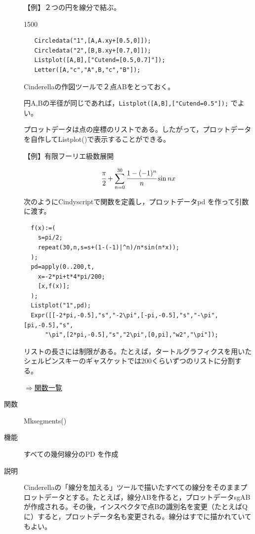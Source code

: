 \documentclass[papersize,a4paper,12pt,uplatex]{jsarticle}
\begin{document}
\begin{description}
\vspace{\baselineskip}
【例】２つの円を線分で結ぶ。
  
\begin{layer}{150}{0}
\end{layer}
\hspace{20mm}

\begin{verbatim}
   Circledata("1",[A,A.xy+[0.5,0]]);
   Circledata("2",[B,B.xy+[0.7,0]]);
   Listplot([A,B],["Cutend=[0.5,0.7]"]);
   Letter([A,"c","A",B,"c","B"]);
\end{verbatim}
  Cinderellaの作図ツールで２点ABをとっておく。

円A,Bの半径が同じであれば，\verb|Listplot([A,B],["Cutend=0.5"]);| でよい。

\vspace{\baselineskip}
プロットデータは点の座標のリストである。したがって，プロットデータを自作してListplot()で表示することができる。

\vspace{\baselineskip}
【例】有限フーリエ級数展開

           \[\cfrac{\pi}{2}+\sum_{n=0}^{30} \cfrac{1-(-1)^n}{n}\sin nx\]

次のようにCindyscriptで関数を定義し，プロットデータpd を作って引数に渡す。
\begin{verbatim}
  f(x):=(
    s=pi/2;
    repeat(30,n,s=s+(1-(-1)|^n)/n*sin(n*x));
  );
  pd=apply(0..200,t,
    x=-2*pi+t*4*pi/200;
    [x,f(x)];
  );
  Listplot("1",pd);
  Expr([[-2*pi,-0.5],"s","-2\pi",[-pi,-0.5],"s","-\pi",[pi,-0.5],"s",
      "\pi",[2*pi,-0.5],"s","2\pi",[0,pi],"w2","\pi"]);
\end{verbatim}

\vspace{\baselineskip}
\hspace{20mm}

\vspace{\baselineskip}
 リストの長さには制限がある。たとえば，タートルグラフィクスを用いたシェルピンスキーのギャスケットでは200くらいずつのリストに分割する。
 
 \hspace{20mm}\scalebox{0.9}{ }
\begin{flushright}  \hyperlink{functionlist}{$\Rightarrow$関数一覧}\end{flushright}

\vspace{\baselineskip}
\hypertarget{mksegments}{}
\item[関数]  Mksegments()
\item[機能]  すべての幾何線分のPD を作成
\item[説明]  Cinderellaの「線分を加える」ツールで描いたすべての線分をそのままプロットデータとする。たとえば，線分ABを作ると，プロットデータsgABが作成される。その後，インスペクタで点Bの識別名を変更（たとえばQに）すると，プロットデータ名も変更される。線分はすでに描かれていてもよい。


\end{description}
\end{document}
